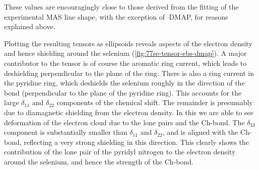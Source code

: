 \begin{refsection}
These values are encouragingly close to those derived from the fitting of the experimental MAS line shape, with the exception of $ \cdot $DMAP, for reasons explained above.

Plotting the resulting tensors as ellipsoids reveals aspects of the electron density and hence shielding around the selenium (\cref{fig:77se-tensor-ebs-dmap}).
A major contributor to the tensor is of course the aromatic ring current, which leads to deshielding perpendicular to the plane of the ring.
There is also a ring current in the pyridine ring, which deshields the selenium roughly in the direction of the  bond (perpendicular to the plane of the pyridine ring).
This accounts for the large $\delta_{11}$ and $\delta_{22}$ components of the chemical shift.
The remainder is presumably due to diamagnetic shielding from the electron density.
In this we are able to see deformation of the electron cloud due to the lone pairs and the Ch-bond.
The  $\delta_{33}$ component is substantially smaller than $\delta_{11}$ and $\delta_{22}$, and is aligned with the Ch-bond, reflecting a very strong shielding in this direction.
This clearly shows the contribution of the lone pair of the pyridyl nitrogen to the electron density around the selenium, and hence the strength of the Ch-bond.


\end{refsection}
